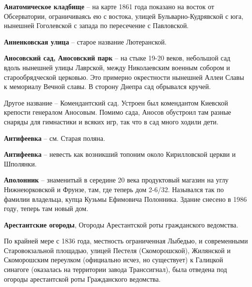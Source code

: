 \medskip


\textbf{Анатомическое кладбище} – на карте 1861 года показано на восток от Обсерватории, ограничиваясь ею с востока, улицей Бульварно-Кудрявской с юга, нынешней Гоголевской с запада по пересечение с Павловской.

\medskip


\textbf{Анненковская улица} – старое название Лютеранской.\\

\medskip


\textbf{Аносовский сад, Аносовский парк} – на стыке 19-20 веков, небольшой сад вдоль нынешней улицы Лаврской, между Николаевским военным собором и старообрядческой церковью. Это примерно окрестности нынешней Аллеи Славы к мемориалу Вечной славы. В сторону Днепра сад обрывался кручей.

Другое название – Комендантский сад. Устроен был комендантом Киевской крепости генералом Аносовым. Помимо сада, Аносов обустроил там разные снаряды для гимнастики и всяких игр, так что в сад много ходили дети.\\ 

\medskip


\textbf{Антифеевка} – см. Старая поляна.\\

\medskip


\textbf{Антифеевка} – невесть как возникший топоним около Кирилловской церкви и Шполянки.\\

\medskip



\textbf{Аполонник} – знаменитый в середине 20 века продуктовый магазин на углу Нижнеюрковской и Фрунзе, там, где теперь дом 2-6/32. Назывался так по фамилии владельца, купца Кузьмы Ефимовича Полонника. Здание снесено в 1986 году, теперь там новый дом.\\

\medskip


\textbf{Арестантские огороды}, Огороды Арестантской роты гражданского ведомства.

По крайней мере с 1836 года, местность ограниченная Лыбедью, и современными Старовокзальной площадью, улицей Пестеля (Скоморошской), Жилянской и Скоморошским переулком (официально исчез, но существует) к Галицкой синагоге (оказалась на территории завода Транссигнал), была отведена под огороды арестантской роты Гражданского ведомства.

